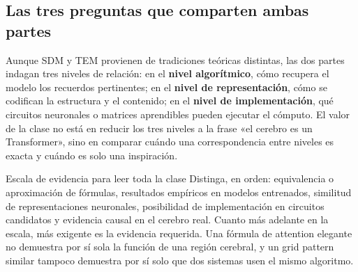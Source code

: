 



\subsection{Las tres preguntas que comparten ambas partes}

Aunque SDM y TEM provienen de tradiciones teóricas distintas, las dos partes indagan tres niveles de relación: en el \textbf{nivel algorítmico}, cómo recupera el modelo los recuerdos pertinentes; en el \textbf{nivel de representación}, cómo se codifican la estructura y el contenido; en el \textbf{nivel de implementación}, qué circuitos neuronales o matrices aprendibles pueden ejecutar el cómputo. El valor de la clase no está en reducir los tres niveles a la frase «el cerebro es un Transformer», sino en comparar cuándo una correspondencia entre niveles es exacta y cuándo es solo una inspiración.

\begin{importantbox}{Escala de evidencia para leer toda la clase}
Distinga, en orden: equivalencia o aproximación de fórmulas, resultados empíricos en modelos entrenados, similitud de representaciones neuronales, posibilidad de implementación en circuitos candidatos y evidencia causal en el cerebro real. Cuanto más adelante en la escala, más exigente es la evidencia requerida. Una fórmula de attention elegante no demuestra por sí sola la función de una región cerebral, y un grid pattern similar tampoco demuestra por sí solo que dos sistemas usen el mismo algoritmo.
\end{importantbox}


